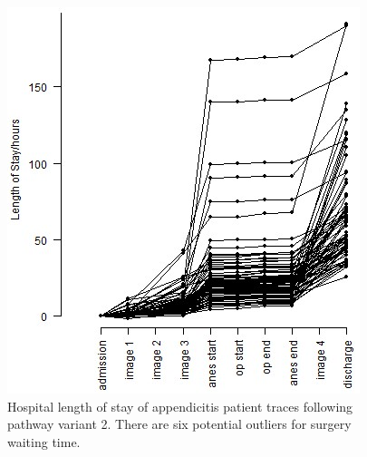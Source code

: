 \begin{figure}[t]
\begin{minipage}{0.48\textwidth}
        \includegraphics[width=\textwidth]{images/appendicitis_variant_length_of_stay_2_journal.jpg}
        \caption{Hospital length of stay of appendicitis patient traces following pathway variant 2. There are six potential outliers for surgery waiting time.}
        \label{fig:appendicitis length of stay variant 2}
    \end{minipage}
\end{figure}